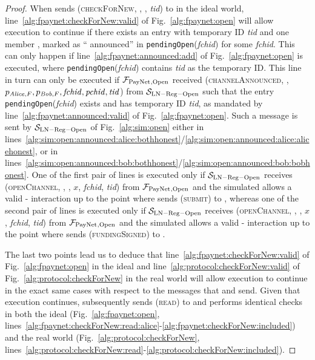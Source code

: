 \begin{proof}
  When \environment{} sends (\textsc{checkForNew}, \alice, \bob, \textit{tid})
  to \alice{} in the ideal world, line~\ref{alg:fpaynet:checkForNew:valid} of
  Fig.~\ref{alg:fpaynet:open} will allow execution to continue if there exists
  an entry with temporary ID \textit{tid} and one member \alice, marked as
  ``\alice{} announced'' in \texttt{pendingOpen}(\textit{fchid}) for some
  \textit{fchid}. This can only happen if line~\ref{alg:fpaynet:announced:add}
  of Fig.~\ref{alg:fpaynet:open} is executed, where
  \texttt{pendingOpen}(\textit{fchid}) contains \textit{tid} as the temporary
  ID. This line in turn can only be executed if $\mathcal{F}_{\mathrm{PayNet}}{}_{\mathrm{, Open}}$
  received (\textsc{channelAnnounced}, \alice, $p_{\mathit{Alice}, F}, p_{\mathit{Bob}, F},
  \mathit{fchid}, \mathit{pchid}, \mathit{tid}$) from $\mathcal{S}_{\mathrm{LN -
  Reg - Open}}$ such that the entry \texttt{pendingOpen}(\textit{fchid}) exists
  and has temporary ID \textit{tid}, as mandated by
  line~\ref{alg:fpaynet:announced:valid} of Fig.~\ref{alg:fpaynet:open}. Such a
  message is sent by $\mathcal{S}_{\mathrm{LN - Reg - Open}}$ of
  Fig.~\ref{alg:sim:open} either in
  lines~\ref{alg:sim:open:announced:alice:bothhonest}/\ref{alg:sim:open:announced:alice:alicehonest},
  or in
  lines~\ref{alg:sim:open:announced:bob:bothhonest}/\ref{alg:sim:open:announced:bob:bobhonest}.
  One of the first pair of lines is executed only if $\mathcal{S}_{\mathrm{LN -
  Reg - Open}}$ receives (\textsc{openChannel}, \alice, \bob, $x$,
  \textit{fchid}, \textit{tid}) from $\mathcal{F}_{\mathrm{PayNet}}{}_{\mathrm{, Open}}$ and the
  simulated \adversary{} allows a valid \alice-\bob{} interaction up to the
  point where \alice{} sends (\textsc{submit}) to \ledger, whereas one of the
  second pair of lines is executed only if $\mathcal{S}_{\mathrm{LN - Reg -
  Open}}$ receives (\textsc{openChannel}, \bob, \alice, $x$, \textit{fchid},
  \textit{tid}) from $\mathcal{F}_{\mathrm{PayNet}}{}_{\mathrm{, Open}}$ and the simulated
  \adversary{} allows a valid \alice-\bob{} interaction up to the point where
  \alice{} sends (\textsc{fundingSigned}) to \bob.

  The last two points lead us to deduce that
  line~\ref{alg:fpaynet:checkForNew:valid} of Fig.~\ref{alg:fpaynet:open} in the
  ideal and line~\ref{alg:protocol:checkForNew:valid} of
  Fig.~\ref{alg:protocol:checkForNew} in the real world will allow execution to
  continue in the exact same cases with respect to the messages that
  \environment{} and \adversary{} send. Given that execution continues,
  \alice{} subsequently sends (\textsc{read}) to \ledger{} and performs
  identical checks in both the ideal (Fig.~\ref{alg:fpaynet:open},
  lines~\ref{alg:fpaynet:checkForNew:read:alice}-\ref{alg:fpaynet:checkForNew:included})
  and the real world (Fig.~\ref{alg:protocol:checkForNew},
  lines~\ref{alg:protocol:checkForNew:read}-\ref{alg:protocol:checkForNew:included}).


\end{proof}
